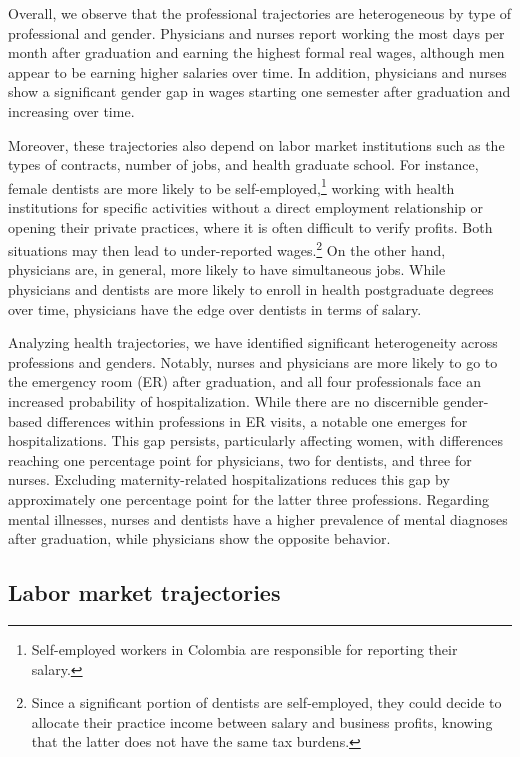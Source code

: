 \documentclass[12pt, a4paper]{article}
\begin{document}
Overall, we observe that the professional trajectories are heterogeneous by type of professional and gender. Physicians and nurses report working the most days per month after graduation and earning the highest formal real wages, although men appear to be earning higher salaries over time. In addition, physicians and nurses show a significant gender gap in wages starting one semester after graduation and increasing over time.

Moreover, these trajectories also depend on labor market institutions such as the types of contracts, number of jobs, and health graduate school. For instance, female dentists are more likely to be self-employed,\footnote{Self-employed workers in Colombia are responsible for reporting their salary.} working with health institutions for specific activities without a direct employment relationship or opening their private practices, where it is often difficult to verify profits. Both situations may then lead to under-reported wages.\footnote{Since a significant portion of dentists are self-employed, they could decide to allocate their practice income between salary and business profits, knowing that the latter does not have the same tax burdens.} On the other hand, physicians are, in general, more likely to have simultaneous jobs. While physicians and dentists are more likely to enroll in health postgraduate degrees over time, physicians have the edge over dentists in terms of salary.

Analyzing health trajectories, we have identified significant heterogeneity across professions and genders. Notably, nurses and physicians are more likely to go to the emergency room (ER) after graduation, and all four professionals face an increased probability of hospitalization. While there are no discernible gender-based differences within professions in ER visits, a notable one emerges for hospitalizations. This gap persists, particularly affecting women, with differences reaching one percentage point for physicians, two for dentists, and three for nurses. Excluding maternity-related hospitalizations reduces this gap by approximately one percentage point for the latter three professions. Regarding mental illnesses, nurses and dentists have a higher prevalence of mental diagnoses after graduation, while physicians show the opposite behavior.


\subsection{Labor market trajectories \label{sec:pila}}
\end{document}
